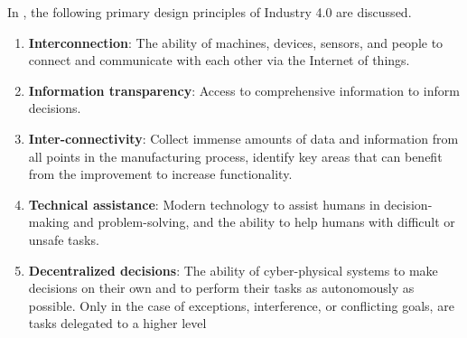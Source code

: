In \cite{hermann2016design}, the following primary design principles of Industry 4.0 are discussed.
\begin{enumerate}

 \item \textbf{Interconnection}: The ability of machines, devices, sensors, and people to connect and communicate with each other via the Internet of things.
 \item \textbf{Information transparency}: Access to comprehensive information to inform decisions. \item \textbf{Inter-connectivity}: Collect immense amounts of data and information from all points in the manufacturing process, identify key areas that can benefit from the improvement to increase functionality.
 \item \textbf{Technical assistance}: Modern technology to assist humans in decision-making and problem-solving, and the ability to help humans with difficult or unsafe tasks.
 \item \textbf{Decentralized decisions}: The ability of cyber-physical systems to make decisions on their own and to perform their tasks as autonomously as possible. Only in the case of exceptions, interference, or conflicting goals, are tasks delegated to a higher level
\end{enumerate}






